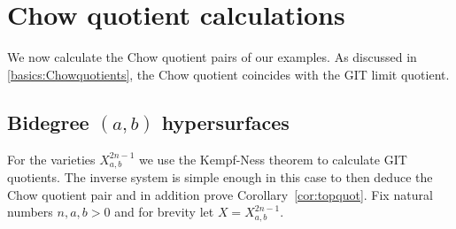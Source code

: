 \section{Chow quotient calculations}
We now calculate the Chow quotient pairs of our examples. As discussed in \ref{basics:Chowquotients}, the Chow quotient coincides with the GIT limit quotient.
\subsection{Bidegree $(a,b)$ hypersurfaces} \label{subsec:hypersurfaces}
For the varieties \(X_{a,b}^{2n-1}\) we use the Kempf-Ness theorem to calculate GIT quotients. The inverse system is simple enough in this case to then deduce the Chow quotient pair and in addition prove Corollary~\ref{cor:topquot}. Fix natural numbers \(n,a,b>0\) and for brevity let \(X = X_{a,b}^{2n-1} \).

